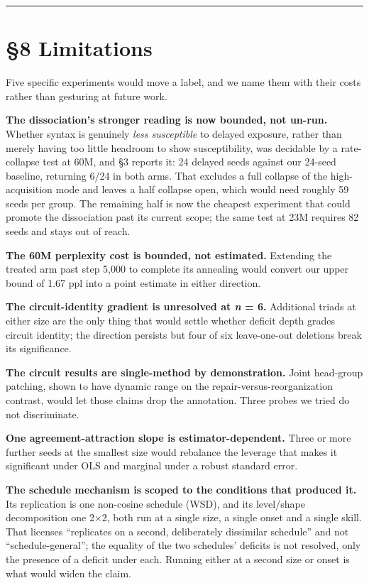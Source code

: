 \documentclass[11pt]{article}
\begin{document}
\begin{center}\rule{0.5\linewidth}{0.5pt}\end{center}

\section{§8 Limitations}\label{limitations}

Five specific experiments would move a label, and we name them with their costs rather than
gesturing at future work.

\textbf{The dissociation's stronger reading is now bounded, not un-run.} Whether syntax is
genuinely \emph{less susceptible} to delayed exposure, rather than merely having too little
headroom to show susceptibility, was decidable by a rate-collapse test at 60M, and §3 reports
it: 24 delayed seeds against our 24-seed baseline, returning 6/24 in both arms. That excludes
a full collapse of the high-acquisition mode and leaves a half collapse open, which would
need roughly 59 seeds per group. The remaining half is now the cheapest experiment that could
promote the dissociation past its current scope; the same test at 23M requires 82 seeds and
stays out of reach.

\textbf{The 60M perplexity cost is bounded, not estimated.} Extending the treated arm past step
5,000 to complete its annealing would convert our upper bound of 1.67 ppl into a point
estimate in either direction.

\textbf{The circuit-identity gradient is unresolved at \emph{n} = 6.} Additional triads at either size
are the only thing that would settle whether deficit depth grades circuit identity; the
direction persists but four of six leave-one-out deletions break its significance.

\textbf{The circuit results are single-method by demonstration.} Joint head-group patching, shown
to have dynamic range on the repair-versus-reorganization contrast, would let those claims
drop the annotation. Three probes we tried do not discriminate.

\textbf{One agreement-attraction slope is estimator-dependent.} Three or more further seeds at the
smallest size would rebalance the leverage that makes it significant under OLS and marginal
under a robust standard error.

\textbf{The schedule mechanism is scoped to the conditions that produced it.} Its replication is
one non-cosine schedule (WSD), and its level/shape decomposition one 2×2, both run at a
single size, a single onset and a single skill. That licenses ``replicates on a second,
deliberately dissimilar schedule'' and not ``schedule-general''; the equality of the two
schedules' deficits is not resolved, only the presence of a deficit under each. Running
either at a second size or onset is what would widen the claim.
\end{document}

